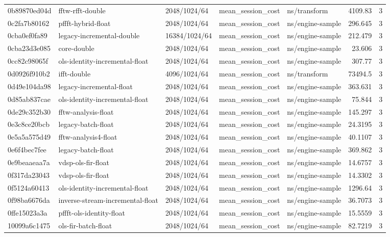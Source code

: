 \begin{longtable}{lllllrr}
0b89870ed04d & fftw-rfft-double & 2048/1024/64 & mean\_session\_cost & ns/transform & 4109.83 & 3 \\
0c2fa7b80162 & pffft-hybrid-float & 2048/1024/64 & mean\_session\_cost & ns/engine-sample & 296.645 & 3 \\
0cba0ef0fa89 & legacy-incremental-double & 16384/1024/64 & mean\_session\_cost & ns/engine-sample & 212.479 & 3 \\
0cba23d3e085 & core-double & 2048/1024/64 & mean\_session\_cost & ns/engine-sample & 23.606 & 3 \\
0cc82c98065f & ols-identity-incremental-float & 2048/1024/64 & mean\_session\_cost & ns/engine-sample & 307.77 & 3 \\
0d0926f910b2 & ifft-double & 4096/1024/64 & mean\_session\_cost & ns/transform & 73494.5 & 3 \\
0d49e104da98 & legacy-incremental-float & 2048/1024/64 & mean\_session\_cost & ns/engine-sample & 363.631 & 3 \\
0d85ab837cae & ols-identity-incremental-float & 2048/1024/64 & mean\_session\_cost & ns/engine-sample & 75.844 & 3 \\
0de29c352b30 & fftw-analysis-float & 2048/1024/64 & mean\_session\_cost & ns/engine-sample & 145.297 & 3 \\
0e3c8ce20bcb & legacy-batch-float & 2048/1024/64 & mean\_session\_cost & ns/engine-sample & 24.3195 & 3 \\
0e5a5a575d49 & fftw-analysis4-float & 2048/1024/64 & mean\_session\_cost & ns/engine-sample & 40.1107 & 3 \\
0e6f4bec7fee & legacy-batch-float & 2048/1024/64 & mean\_session\_cost & ns/engine-sample & 369.862 & 3 \\
0e9beaaeaa7a & vdsp-ols-fir-float & 2048/1024/64 & mean\_session\_cost & ns/engine-sample & 14.6757 & 3 \\
0f317da23043 & vdsp-ols-fir-float & 2048/1024/64 & mean\_session\_cost & ns/engine-sample & 14.3302 & 3 \\
0f5124a60413 & ols-identity-incremental-float & 2048/1024/64 & mean\_session\_cost & ns/engine-sample & 1296.64 & 3 \\
0f98ba6676da & inverse-stream-incremental-float & 2048/1024/64 & mean\_session\_cost & ns/engine-sample & 36.7073 & 3 \\
0ffe15023a3a & pffft-ols-identity-float & 2048/1024/64 & mean\_session\_cost & ns/engine-sample & 15.5559 & 3 \\
10099a6c1475 & ols-fir-batch-float & 2048/1024/64 & mean\_session\_cost & ns/engine-sample & 82.7219 & 3 \\

\end{longtable}
